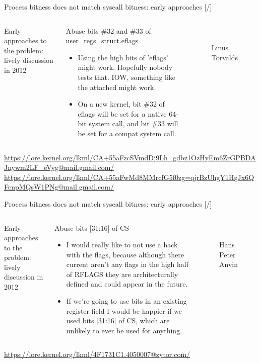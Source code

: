 \documentclass[unicode,aspectratio=169,xcolor={table,dvipsnames,usernames}]{beamer}
\begin{document}
\begin{frame}{Process bitness does not match syscall bitness: early approaches \hfill [\insertframenumber/\inserttotalframenumber]}
\Large
\begin{columns}
	\column{11cm}
		{\large Early approaches to the problem: lively discussion in 2012}
		\begin{block}{Abuse bits \#32 and \#33 of user\_regs\_struct.eflags}
		\begin{itemize}
			\item Using the high bits of 'eflags' might work.
			Hopefully nobody tests that.
			IOW, something like the attached might work.

			\item On a new kernel,
			bit \#32 of eflags will be set for a native 64-bit system call,
			and bit \#33 will be set for a compat system call.
		\end{itemize}
		\end{block}
	\column{2.5cm}
		\begin{figure}
			\centering
			 \\
			Linus \\ Torvalds
		\end{figure}
\end{columns}
\bigskip
\tiny
\url{https://lore.kernel.org/lkml/CA+55aFzcSVmdDj9Lh_gdbz1OzHyEm6ZrGPBDAJnywm2LF_eVyg@mail.gmail.com/}
\url{https://lore.kernel.org/lkml/CA+55aFwMd8MMrcfG5f0zg=qjrBzUhgY1HgJx6QFcnpMQsW1PNg@mail.gmail.com/}
\end{frame}

\begin{frame}{Process bitness does not match syscall bitness: early approaches \hfill [\insertframenumber/\inserttotalframenumber]}
\Large
\begin{columns}
	\column{11cm}
		{\large Early approaches to the problem: lively discussion in 2012}
		\begin{block}{Abuse bits [31:16] of CS}
		\begin{itemize}
			\item I would really like to not use a hack with the flags,
			because although there current aren't any flags in the high half of RFLAGS
			they are architecturally defined and could appear in the future.

			\item If we're going to use bits in an existing register field
			I would be happier if we used bits [31:16] of CS,
			which are unlikely to ever be used for anything.
		\end{itemize}
		\end{block}
	\column{2.5cm}
		\begin{figure}
			\centering
			 \\
			Hans Peter \\ Anvin
		\end{figure}
\end{columns}
\bigskip
\tiny
\url{https://lore.kernel.org/lkml/4F1731C1.4050007@zytor.com/}
\end{frame}
\end{document}

